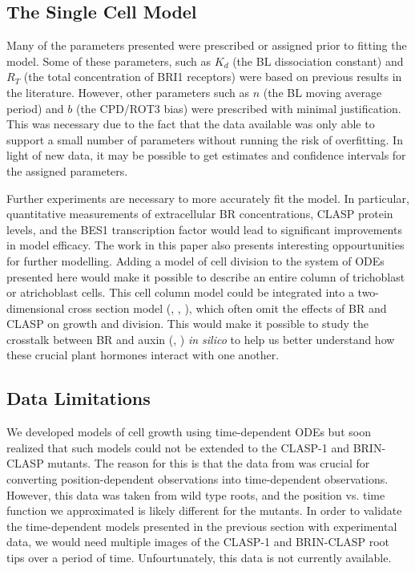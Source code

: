 
\subsection{The Single Cell Model}

Many of the parameters presented were prescribed or assigned prior to fitting the model. Some of these parameters, such as $K_{d}$ (the BL dissociation constant) and $R_{T}$ (the total concentration of BRI1 receptors) were based on previous results in the literature. However, other parameters such as $n$ (the BL moving average period) and $b$ (the CPD/ROT3 bias) were prescribed  with minimal justification. This was necessary due to the fact that the data available was only able to support a small number of parameters without running the risk of overfitting. In light of new data, it may be possible to get estimates and confidence intervals for the assigned parameters.

\medskip

Further experiments are necessary to more accurately fit the model. In particular, quantitative measurements of extracellular BR concentrations, CLASP protein levels, and the BES1 transcription factor would lead to significant improvements in model efficacy. The work in this paper also presents interesting oppourtunities for further modelling. Adding a model of cell division to the system of ODEs presented here would make it possible to describe an entire column of trichoblast or atrichoblast cells. This cell column model could be integrated into a two-dimensional cross section model (\cite{grieneisen2007}, \cite{dimambro2017}, \cite{salvi2020}), which often omit the effects of BR and CLASP on growth and division. This would make it possible to study the crosstalk between BR and auxin (\cite{chaiwanon2015}, \cite{vragovic2015}) \emph{in silico} to help us better understand how these crucial plant hormones interact with one another.

\subsection{Data Limitations}


We developed models of cell growth using time-dependent ODEs but soon realized that such models could not be extended to the CLASP-1 and BRIN-CLASP mutants. The reason for this is that the data from \cite{goh2023} was crucial for converting position-dependent observations into time-dependent observations. However, this data was taken from wild type roots, and the position vs. time function we approximated is likely different for the mutants. In order to validate the time-dependent models presented in the previous section with experimental data, we would need multiple images of the CLASP-1 and BRIN-CLASP root tips over a period of time. Unfourtunately, this data is not currently available.


